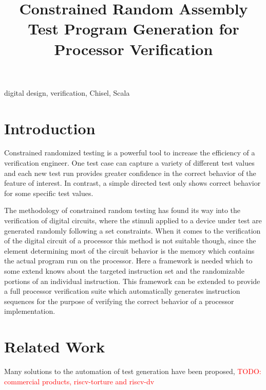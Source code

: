 \documentclass[conference]{IEEEtran}
\title{Constrained Random Assembly Test Program Generation for Processor Verification}
\author{
\IEEEauthorblockN{Tjark Petersen, Martin Schoeberl}
\IEEEauthorblockA{\textit{Department of Applied Mathematics and Computer Science} \\
\textit{Technical University of Denmark}\\
Lyngby, Denmark \\
s186083@student.dtu.dk, masca@dtu.dk}
}
\newcommand{\todo}[1]{\textcolor{red}{TODO: #1}}
\begin{document}
\IEEEoverridecommandlockouts

\maketitle

\pagestyle{empty}

\begin{abstract}

\end{abstract}

\begin{IEEEkeywords}
digital design, verification, Chisel, Scala
\end{IEEEkeywords}


\section{Introduction}
\label{sec:introduction}
Constrained randomized testing is a powerful tool to increase the efficiency of a verification engineer. 
One test case can capture a variety of different test values and each new test run provides greater 
confidence in the correct behavior of the feature of interest. In contrast, a simple directed test 
only shows correct behavior for some specific test values.

The methodology of constrained random testing has found its way into the verification of digital 
circuits, where the stimuli applied to a device under test are generated randomly following a set 
constraints. When it comes to the verification of the digital circuit of a processor this method 
is not suitable though, since the element determining most of the circuit behavior is the memory 
which contains the actual program run on the processor. Here a framework is needed which to some 
extend knows about the targeted instruction set and the randomizable portions of an individual 
instruction. This framework can be extended to provide a full processor verification suite which 
automatically generates instruction sequences for the purpose of verifying the correct behavior 
of a processor implementation.

\section{Related Work}

Many solutions to the automation of test generation have been proposed, \todo{commercial products, riscv-torture and riscv-dv}
\end{document}
